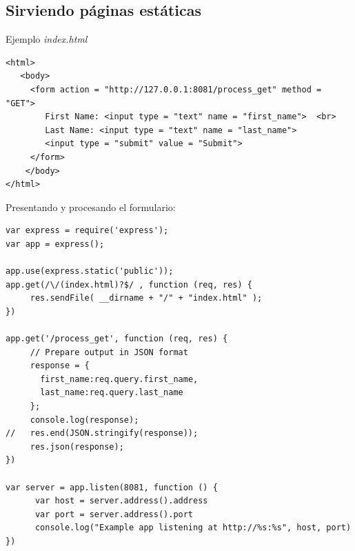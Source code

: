 \documentclass[4paper]{article}
\begin{document}
\subsection{Sirviendo páginas estáticas}
Ejemplo \emph{index.html}
\begin{verbatim}
<html>
   <body>
     <form action = "http://127.0.0.1:8081/process_get" method = "GET">
        First Name: <input type = "text" name = "first_name">  <br>
        Last Name: <input type = "text" name = "last_name">
        <input type = "submit" value = "Submit">
     </form>
    </body>                                              
</html>
\end{verbatim}
Presentando y procesando el formulario:
\begin{verbatim}
var express = require('express');
var app = express();

app.use(express.static('public'));
app.get(/\/(index.html)?$/ , function (req, res) {
     res.sendFile( __dirname + "/" + "index.html" );
})

app.get('/process_get', function (req, res) {
     // Prepare output in JSON format
     response = {
       first_name:req.query.first_name,
       last_name:req.query.last_name
     };
     console.log(response);
//   res.end(JSON.stringify(response));
     res.json(response);
})

var server = app.listen(8081, function () {
      var host = server.address().address
      var port = server.address().port
      console.log("Example app listening at http://%s:%s", host, port)
})
\end{verbatim}
\end{document}
